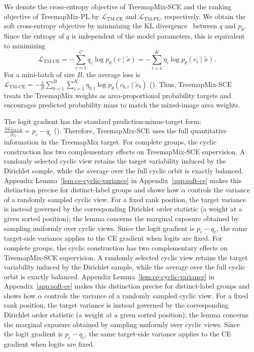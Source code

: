 We denote the cross-entropy objective of TreemapMix-SCE and the ranking objective of TreemapMix-PL by $\mathcal{L}_{\mathrm{TM\text{-}CE}}$ and $\mathcal{L}_{\mathrm{TM\text{-}PL}}$, respectively. We obtain the soft cross-entropy objective by minimizing the KL divergence~\cite{kullback1951} between $q$ and $p_\theta$. Since the entropy of $q$ is independent of the model parameters, this is equivalent to minimizing
\begin{equation}
\label{eq:lm-ce}
\mathcal{L}_{\mathrm{TM\text{-}CE}}=-\sum_{c=1}^{C}q_c\log p_\theta(c\mid\tilde{x})=-\sum_{i=1}^{K}\eta_i\log p_\theta(c_i\mid\tilde{x}).
\end{equation}
For a mini-batch of size $B$, the average loss is \label{eq:lm-ce-batch}\(\mathcal{L}_{\mathrm{TM\text{-}CE}}=-\frac{1}{B}\sum_{b=1}^{B}\sum_{i=1}^{K}\eta_{b,i}\log p_\theta(c_{b,i}\mid\tilde{x}_b)\)\textup{ (\theequation)}.
Thus, TreemapMix-SCE treats the TreemapMix weights as area-proportional probability targets and encourages predicted probability mass to match the mixed-image area weights.

The logit gradient has the standard prediction-minus-target form: \label{eq:lm-ce-grad}\(\frac{\partial \mathcal{L}_{\mathrm{TM\text{-}CE}}}{\partial z_c}=p_c-q_c\)\textup{ (\theequation)}.
Therefore, TreemapMix-SCE uses the full quantitative information in the TreemapMix target.
For complete groups, the cyclic construction has two complementary effects on TreemapMix-SCE supervision. A randomly selected cyclic view retains the target variability induced by the Dirichlet sample, while the average over the full cyclic orbit is exactly balanced. Appendix Lemma~\ref{lem:ce-cyclic-variance} in Appendix~\ref{app:soft-ce} makes this distinction precise for distinct-label groups and shows how $\alpha$ controls the variance of a randomly sampled cyclic view. For a fixed rank position, the target variance is instead governed by the corresponding Dirichlet order statistic (a weight at a given sorted position); the lemma concerns the marginal exposure obtained by sampling uniformly over cyclic views. Since the logit gradient is \(p_c-q_c\), the same target-side variance applies to the CE gradient when logits are fixed.
For complete groups, the cyclic construction has two complementary effects on TreemapMix-SCE supervision. A randomly selected cyclic view retains the target variability induced by the Dirichlet sample, while the average over the full cyclic orbit is exactly balanced. Appendix Lemma~\ref{lem:ce-cyclic-variance} in Appendix~\ref{app:soft-ce} makes this distinction precise for distinct-label groups and shows how $\alpha$ controls the variance of a randomly sampled cyclic view. For a fixed rank position, the target variance is instead governed by the corresponding Dirichlet order statistic (a weight at a given sorted position); the lemma concerns the marginal exposure obtained by sampling uniformly over cyclic views. Since the logit gradient is \(p_c-q_c\), the same target-side variance applies to the CE gradient when logits are fixed.

